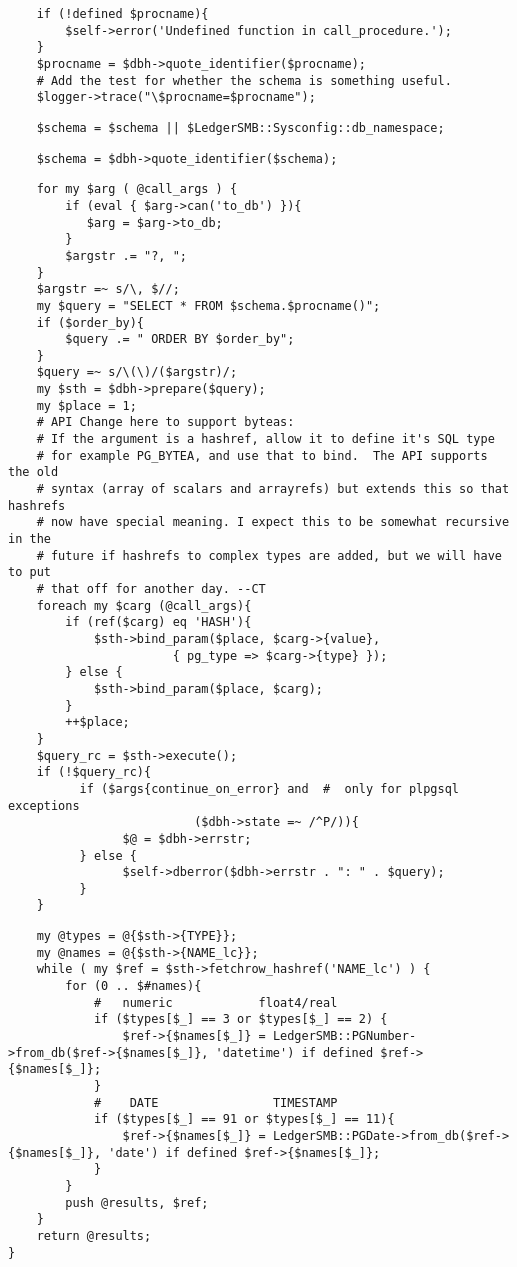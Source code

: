 \begin{verbatim}
    if (!defined $procname){
        $self->error('Undefined function in call_procedure.');
    }
    $procname = $dbh->quote_identifier($procname);
    # Add the test for whether the schema is something useful.
    $logger->trace("\$procname=$procname");
\end{verbatim}
\begin{verbatim}
    $schema = $schema || $LedgerSMB::Sysconfig::db_namespace;
\end{verbatim}
\begin{verbatim}
    $schema = $dbh->quote_identifier($schema);
\end{verbatim}
\begin{verbatim}
    for my $arg ( @call_args ) {
        if (eval { $arg->can('to_db') }){
           $arg = $arg->to_db;
        }
        $argstr .= "?, ";
    }
    $argstr =~ s/\, $//;
    my $query = "SELECT * FROM $schema.$procname()";
    if ($order_by){
        $query .= " ORDER BY $order_by";
    }
    $query =~ s/\(\)/($argstr)/;
    my $sth = $dbh->prepare($query);
    my $place = 1;
    # API Change here to support byteas:  
    # If the argument is a hashref, allow it to define it's SQL type
    # for example PG_BYTEA, and use that to bind.  The API supports the old
    # syntax (array of scalars and arrayrefs) but extends this so that hashrefs
    # now have special meaning. I expect this to be somewhat recursive in the
    # future if hashrefs to complex types are added, but we will have to put 
    # that off for another day. --CT
    foreach my $carg (@call_args){
        if (ref($carg) eq 'HASH'){
            $sth->bind_param($place, $carg->{value}, 
                       { pg_type => $carg->{type} });
        } else {
            $sth->bind_param($place, $carg);
        }
        ++$place;
    }
    $query_rc = $sth->execute();
    if (!$query_rc){
          if ($args{continue_on_error} and  #  only for plpgsql exceptions
                          ($dbh->state =~ /^P/)){
                $@ = $dbh->errstr;
          } else {
                $self->dberror($dbh->errstr . ": " . $query);
          }
    }
\end{verbatim}
\begin{verbatim}
    my @types = @{$sth->{TYPE}};
    my @names = @{$sth->{NAME_lc}};
    while ( my $ref = $sth->fetchrow_hashref('NAME_lc') ) {
        for (0 .. $#names){
            #   numeric            float4/real
            if ($types[$_] == 3 or $types[$_] == 2) {
                $ref->{$names[$_]} = LedgerSMB::PGNumber->from_db($ref->{$names[$_]}, 'datetime') if defined $ref->{$names[$_]};
            }
            #    DATE                TIMESTAMP
            if ($types[$_] == 91 or $types[$_] == 11){
                $ref->{$names[$_]} = LedgerSMB::PGDate->from_db($ref->{$names[$_]}, 'date') if defined $ref->{$names[$_]};
            }
        }
        push @results, $ref;
    }
    return @results;
}
\end{verbatim}


